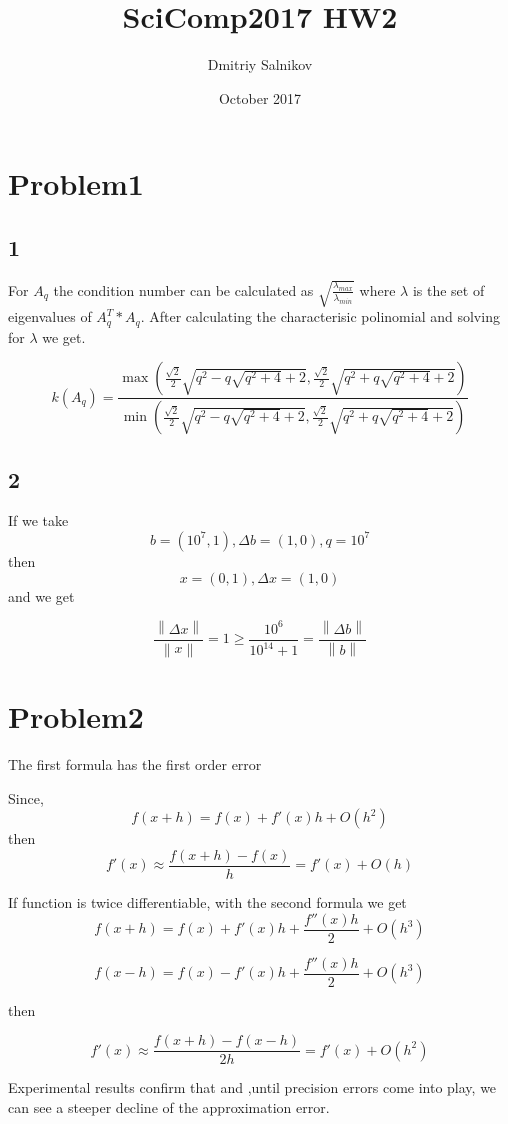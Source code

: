 \documentclass{article}
\title{SciComp2017 HW2}
\author{Dmitriy Salnikov}
\date{October 2017}
\newcommand\norm[1]{\left\lVert#1\right\rVert}
\begin{document}
\maketitle

\section{Problem1}
\subsection{1}
For $A_q$ the condition number can be calculated as $\sqrt{\frac{\lambda_{max}}{\lambda_{min}}}$ where $\lambda$ is the set of eigenvalues of $A_q^{T}*A_q$. After calculating the characterisic polinomial and solving for $\lambda$ we get. 

 \[ 
k(A_q) = 
\frac{\max\left(\frac{\sqrt{2}}{2} \sqrt{q^{2} - q \sqrt{q^{2} + 4} + 2}, \frac{\sqrt{2}}{2} \sqrt{q^{2} + q \sqrt{q^{2} + 4} + 2}\right)}{\min\left(
\frac{\sqrt{2}}{2} \sqrt{q^{2} - q \sqrt{q^{2} + 4} + 2}, \frac{\sqrt{2}}{2} \sqrt{q^{2} + q \sqrt{q^{2} + 4} + 2}\right)}
\]

\subsection{2}

If we take \[ b = (10^7, 1), \Delta{b} = (1, 0), q = 10^7\] then 
\[ x = (0, 1), \Delta{x} = (1, 0)\] and we get 

\[
\frac{\norm{\Delta{x}}}{\norm{x}} = 1 \ge \frac{10^6}{10^{14} + 1} = \frac{\norm{\Delta{b}}}{\norm{b}}
\]


\section{Problem2}
The first formula has the first order  error 

Since,
\[
    f( x + h ) = f(x) + f'(x)h + O(h^2)
\]
then 
\[
    f'(x) \approx \frac{f(x+h) - f(x)}{h} = f'(x) + O(h)
\]

If function is twice differentiable, with the second formula we get
\[
f( x + h ) = f(x) + f'(x)h + \frac{f''(x)h}{2} + O(h^3)
\]

\[
f( x - h ) = f(x) - f'(x)h + \frac{f''(x)h}{2} + O(h^3)
\]

then

\[
    f'(x) \approx \frac{f(x+h) - f(x-h)}{2h} = f'(x) + O(h^2)
\]

Experimental results confirm that and ,until precision errors come into play, we can see a steeper decline of the approximation error.
\end{document}
